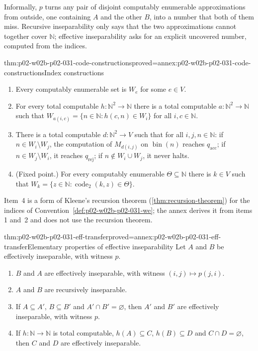 Informally, \(p\) turns any pair of disjoint computably enumerable
approximations from outside, one containing \(A\) and the other \(B\), into a
number that both of them miss.  Recursive inseparability only says that the
two approximations cannot together cover \(\mathbb N\); effective
inseparability asks for an explicit uncovered number, computed from the
indices.

\begin{hblemma}{thm:p02-w02b-p02-031-code-constructions}{proved=annex:p02-w02b-p02-031-code-constructions}{Index constructions}
\begin{enumerate}
\item Every computably enumerable set is \(W_e\) for some \(e\in V\).
\item For every total computable \(h:\mathbb N^{2}\to\mathbb N\) there is a
      total computable \(a:\mathbb N^{2}\to\mathbb N\) such that
      \(W_{a(i,c)}=\{n\in\mathbb N:h(c,n)\in W_i\}\) for all
      \(i,c\in\mathbb N\).
\item There is a total computable \(d:\mathbb N^{2}\to V\) such that for all
      \(i,j,n\in\mathbb N\): if \(n\in W_i\setminus W_j\), the computation of
      \(M_{d(i,j)}\) on \(\operatorname{bin}(n)\) reaches \(q_{\mathrm{acc}}\);
      if \(n\in W_j\setminus W_i\), it reaches \(q_{\mathrm{rej}}\); if
      \(n\notin W_i\cup W_j\), it never halts.
\item (Fixed point.)  For every computably enumerable
      \(\Theta\subseteq\mathbb N\) there is \(k\in V\) such that
      \(W_k=\{z\in\mathbb N:\operatorname{code}_2(k,z)\in\Theta\}\).
\end{enumerate}
\end{hblemma}

Item~4 is a form of Kleene's recursion theorem
(\cref{thm:recursion-theorem}) for the indices of
Convention~\ref{def:p02-w02b-p02-031-we}; the annex derives it from items 1
and~2 and does not use the recursion theorem.

\begin{hblemma}{thm:p02-w02b-p02-031-eff-transfer}{proved=annex:p02-w02b-p02-031-eff-transfer}{Elementary properties of effective inseparability}
Let \(A\) and \(B\) be effectively inseparable, with witness \(p\).
\begin{enumerate}
\item \(B\) and \(A\) are effectively inseparable, with witness
      \((i,j)\mapsto p(j,i)\).
\item \(A\) and \(B\) are recursively inseparable.
\item If \(A\subseteq A'\), \(B\subseteq B'\) and \(A'\cap B'=\varnothing\),
      then \(A'\) and \(B'\) are effectively inseparable, with witness \(p\).
\item If \(h:\mathbb N\to\mathbb N\) is total computable, \(h(A)\subseteq C\),
      \(h(B)\subseteq D\) and \(C\cap D=\varnothing\), then \(C\) and \(D\) are
      effectively inseparable.
\end{enumerate}
\end{hblemma}

